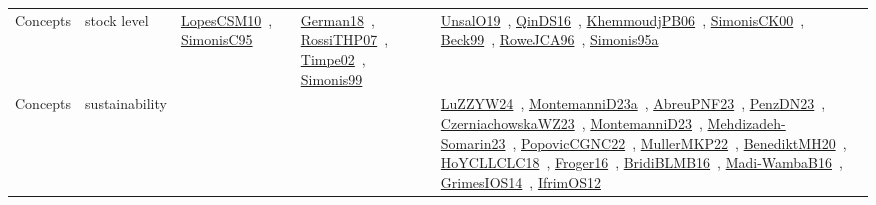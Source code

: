 {\begin{longtable}{lp{3cm}>{\raggedright\arraybackslash}p{6cm}>{\raggedright\arraybackslash}p{6cm}>{\raggedright\arraybackslash}p{8cm}}
\index{stock level}\index{Concepts!stock level}Concepts & stock level & \href{../works/LopesCSM10.pdf}{LopesCSM10}~\cite{LopesCSM10}, \href{../works/SimonisC95.pdf}{SimonisC95}~\cite{SimonisC95} & \href{../works/German18.pdf}{German18}~\cite{German18}, \href{../works/RossiTHP07.pdf}{RossiTHP07}~\cite{RossiTHP07}, \href{../works/Timpe02.pdf}{Timpe02}~\cite{Timpe02}, \href{../works/Simonis99.pdf}{Simonis99}~\cite{Simonis99} & \href{../works/UnsalO19.pdf}{UnsalO19}~\cite{UnsalO19}, \href{../works/QinDS16.pdf}{QinDS16}~\cite{QinDS16}, \href{../works/KhemmoudjPB06.pdf}{KhemmoudjPB06}~\cite{KhemmoudjPB06}, \href{../works/SimonisCK00.pdf}{SimonisCK00}~\cite{SimonisCK00}, \href{../works/Beck99.pdf}{Beck99}~\cite{Beck99}, \href{../works/RoweJCA96.pdf}{RoweJCA96}~\cite{RoweJCA96}, \href{../works/Simonis95a.pdf}{Simonis95a}~\cite{Simonis95a}\\
\index{sustainability}\index{Concepts!sustainability}Concepts & sustainability &  &  & \href{../works/LuZZYW24.pdf}{LuZZYW24}~\cite{LuZZYW24}, \href{../works/MontemanniD23a.pdf}{MontemanniD23a}~\cite{MontemanniD23a}, \href{../works/AbreuPNF23.pdf}{AbreuPNF23}~\cite{AbreuPNF23}, \href{../works/PenzDN23.pdf}{PenzDN23}~\cite{PenzDN23}, \href{../works/CzerniachowskaWZ23.pdf}{CzerniachowskaWZ23}~\cite{CzerniachowskaWZ23}, \href{../works/MontemanniD23.pdf}{MontemanniD23}~\cite{MontemanniD23}, \href{../works/Mehdizadeh-Somarin23.pdf}{Mehdizadeh-Somarin23}~\cite{Mehdizadeh-Somarin23}, \href{../works/PopovicCGNC22.pdf}{PopovicCGNC22}~\cite{PopovicCGNC22}, \href{../works/MullerMKP22.pdf}{MullerMKP22}~\cite{MullerMKP22}, \href{../works/BenediktMH20.pdf}{BenediktMH20}~\cite{BenediktMH20}, \href{../works/HoYCLLCLC18.pdf}{HoYCLLCLC18}~\cite{HoYCLLCLC18}, \href{../works/Froger16.pdf}{Froger16}~\cite{Froger16}, \href{../works/BridiBLMB16.pdf}{BridiBLMB16}~\cite{BridiBLMB16}, \href{../works/Madi-WambaB16.pdf}{Madi-WambaB16}~\cite{Madi-WambaB16}, \href{../works/GrimesIOS14.pdf}{GrimesIOS14}~\cite{GrimesIOS14}, \href{../works/IfrimOS12.pdf}{IfrimOS12}~\cite{IfrimOS12}\\

\end{longtable}}
